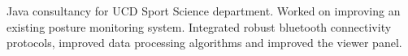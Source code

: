 \documentclass[11pt]{article}
\begin{document}
Java consultancy for UCD Sport Science department. Worked on
improving an existing posture monitoring system. Integrated robust bluetooth 
connectivity protocols, improved data processing algorithms and
improved the viewer panel.

%
%
%
%

%
%
%
%
%
%
\end{document}
